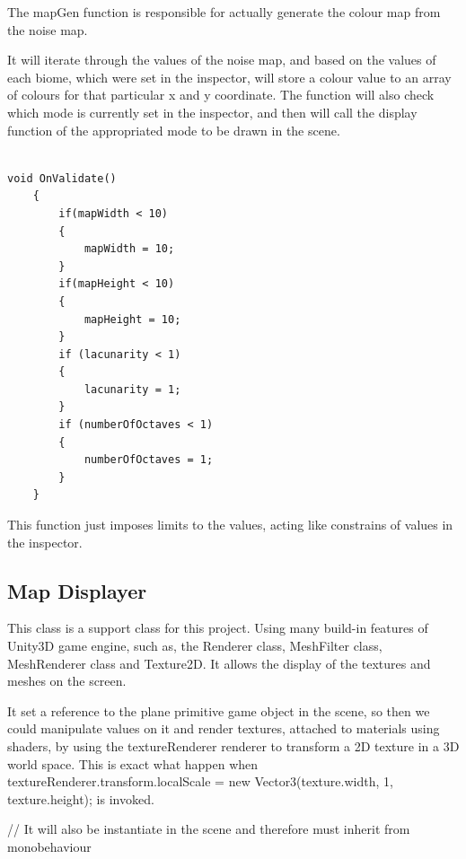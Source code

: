 \documentclass[a4paper,12pt]{book}
\begin{document}
The mapGen function is responsible for actually generate the colour map from the noise map.

It will iterate through the values of the noise map, and based on the values of each biome, which were set in the inspector, will store a colour value to an array of colours for that particular x and y coordinate.
The function will also check which mode is currently set in the inspector, and then will call the display function of the appropriated mode to be drawn in the scene.

\begin{lstlisting}

void OnValidate()
    {
        if(mapWidth < 10)
        {
            mapWidth = 10;
        }
        if(mapHeight < 10)
        {
            mapHeight = 10;
        }
        if (lacunarity < 1)
        {
            lacunarity = 1;
        }
        if (numberOfOctaves < 1)
        {
            numberOfOctaves = 1;
        }
    }

\end{lstlisting}

This function just imposes limits to the values, acting like constrains of values in the inspector.


\subsection{Map Displayer}

This class is a support class for this project.
Using many build-in features of Unity3D game engine, such as, the Renderer class, MeshFilter class, MeshRenderer class and Texture2D. It allows the display of the textures and meshes on the screen.

It set a reference to the plane primitive game object in the scene, so then we could manipulate values on it and render textures, attached to materials using shaders, by using the textureRenderer renderer to transform a 2D texture in a 3D world space. This is exact what happen when textureRenderer.transform.localScale = new Vector3(texture.width, 1, texture.height); is invoked. 

// It will also be instantiate in the scene and therefore must inherit from monobehaviour
\end{document}

